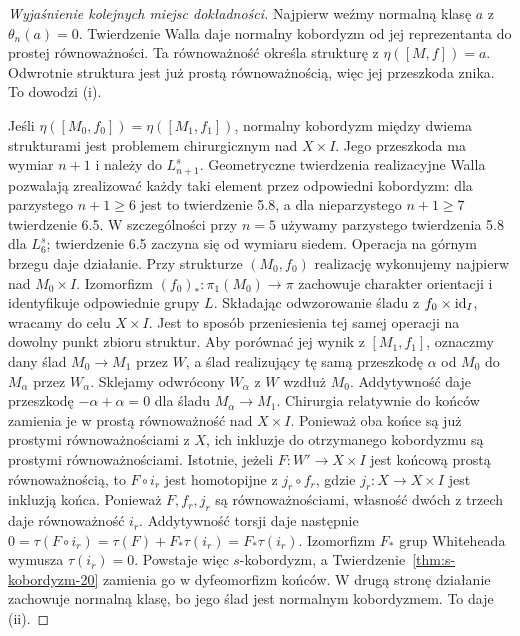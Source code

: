 \begin{proof}[Wyjaśnienie kolejnych miejsc dokładności]
Najpierw weźmy normalną klasę $a$
z $\theta_n(a)=0$. Twierdzenie Walla
daje normalny kobordyzm od jej
reprezentanta do prostej równoważności.
Ta równoważność określa strukturę
z $\eta([M,f])=a$. Odwrotnie struktura
jest już prostą równoważnością,
więc jej przeszkoda znika.
To dowodzi (i).

Jeśli $\eta([M_0,f_0])=\eta([M_1,f_1])$,
normalny kobordyzm między dwiema
strukturami jest problemem chirurgicznym
nad $X\times I$. Jego przeszkoda ma
wymiar $n+1$ i należy do $L_{n+1}^s$.
Geometryczne twierdzenia realizacyjne
Walla pozwalają zrealizować każdy taki
element przez odpowiedni kobordyzm:
dla parzystego $n+1\geq6$ jest to
twierdzenie 5.8, a dla nieparzystego
$n+1\geq7$ twierdzenie 6.5.
W szczególności przy $n=5$ używamy
parzystego twierdzenia 5.8 dla $L_6^s$;
twierdzenie 6.5 zaczyna się od wymiaru siedem.
Operacja na górnym brzegu daje działanie.
Przy strukturze $(M_0,f_0)$ realizację wykonujemy
najpierw nad $M_0\times I$. Izomorfizm
$(f_0)_*:\pi_1(M_0)\to\pi$ zachowuje charakter
orientacji i identyfikuje odpowiednie grupy $L$.
Składając odwzorowanie śladu z $f_0\times\mathrm{id}_I$,
wracamy do celu $X\times I$. Jest to sposób
przeniesienia tej samej operacji na dowolny punkt
zbioru struktur.
Aby porównać jej wynik z $[M_1,f_1]$,
oznaczmy dany ślad $M_0\to M_1$ przez $W$,
a ślad realizujący tę samą przeszkodę
$\alpha$ od $M_0$ do $M_\alpha$ przez $W_\alpha$.
Sklejamy odwrócony $W_\alpha$ z $W$
wzdłuż $M_0$. Addytywność daje
przeszkodę $-\alpha+\alpha=0$ dla śladu
$M_\alpha\to M_1$. Chirurgia relatywnie do końców
zamienia je w prostą równoważność nad
$X\times I$. Ponieważ oba końce są już
prostymi równoważnościami z $X$,
ich inkluzje do otrzymanego kobordyzmu
są prostymi równoważnościami. Istotnie, jeżeli
$F:W'\to X\times I$ jest końcową prostą
równoważnością, to $F\circ i_r$ jest homotopijne
z $j_r\circ f_r$, gdzie $j_r:X\to X\times I$
jest inkluzją końca. Ponieważ $F,f_r,j_r$ są
równoważnościami, własność dwóch z trzech daje
równoważność $i_r$. Addytywność torsji daje następnie
$0=\tau(F\circ i_r)=\tau(F)+F_*\tau(i_r)
=F_*\tau(i_r)$. Izomorfizm $F_*$ grup Whiteheada
wymusza $\tau(i_r)=0$. Powstaje więc
$s$-kobordyzm, a
Twierdzenie~\ref{thm:s-kobordyzm-20}
zamienia go w dyfeomorfizm końców.
W drugą stronę działanie zachowuje
normalną klasę, bo jego ślad jest
normalnym kobordyzmem. To daje (ii).


\end{proof}
